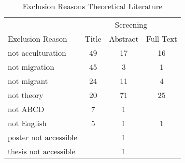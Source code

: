 \begin{table}
\begin{minipage}[t][\textheight][t]{\textwidth}

\caption{\label{tab:TheoryExclusion}Exclusion Reasons Theoretical Literature}
\begin{tabular}[t]{lccc}
\toprule
\multicolumn{1}{c}{ } & \multicolumn{3}{c}{Screening} \\
\cmidrule(l{3pt}r{3pt}){2-4}
Exclusion Reason & Title & Abstract & Full Text\\
\midrule
not acculturation & 49 & 17 & 16\\
not migration & 45 & 3 & 1\\
not migrant & 24 & 11 & 4\\
not theory & 20 & 71 & 25\\
not ABCD & 7 & 1 & \\
not English & 5 & 1 & 1\\
poster not accessible &  & 1 & \\
thesis not accessible &  & 1 & \\
\bottomrule
\end{tabular}
\end{minipage}
\end{table}

